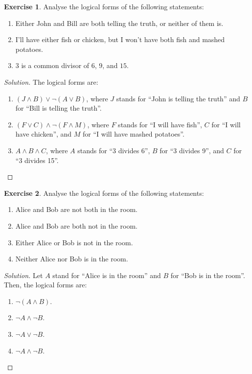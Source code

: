 \documentclass[headings=standardclasses]{scrartcl}
\theoremstyle{definition}
\newtheorem{exercise}{Exercise}[subsection]
\newenvironment{solution}{\begin{proof}[Solution]}{\end{proof}}
\begin{document}
\begin{exercise}
  Analyse the logical forms of the following statements:
  \begin{enumerate}
    \item Either John and Bill are both telling the truth, or neither of them
          is.
    \item I'll have either fish or chicken, but I won't have both fish and
          mashed potatoes.
    \item \(3\) is a common divisor of \(6\), \(9\), and \(15\).
  \end{enumerate}
\end{exercise}

\begin{solution}
  The logical forms are:
  \begin{enumerate}
    \item \((J \land B) \lor \lnot (A \lor B)\), where \(J\) stands for
          \enquote{John is telling the truth} and \(B\) for \enquote{Bill is
          telling the truth}.
    \item \((F \lor C) \land \lnot (F \land M)\), where \(F\) stands for
          \enquote{I will have fish}, \(C\) for \enquote{I will have chicken},
          and \(M\) for \enquote{I will have mashed potatoes}.
    \item \(A \land B \land C\), where \(A\) stands for \enquote{3 divides 6},
          \(B\) for \enquote{3 divides 9}, and \(C\) for \enquote{3 divides
          15}. \qedhere
  \end{enumerate}
\end{solution}

\begin{exercise}
  Analyse the logical forms of the following statements:
  \begin{enumerate}
    \item Alice and Bob are not both in the room.
    \item Alice and Bob are both not in the room.
    \item Either Alice or Bob is not in the room.
    \item Neither Alice nor Bob is in the room.
  \end{enumerate}
\end{exercise}

\begin{solution}
  Let \(A\) stand for \enquote{Alice is in the room} and \(B\) for \enquote{Bob
  is in the room}. Then, the logical forms are:
  \begin{enumerate}
    \item \(\lnot (A \land B)\).
    \item \(\lnot A \land \lnot B\).
    \item \(\lnot A \lor \lnot B\).
    \item \(\lnot A \land \lnot B\). \qedhere
  \end{enumerate}
\end{solution}
\end{document}
